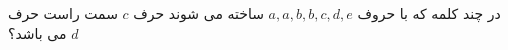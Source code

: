 \exercise
در چند کلمه که با حروف 
$a, a, b, b, c, d, e$
ساخته می شوند حرف 
$c$
سمت راست حرف
$d$
می باشد؟